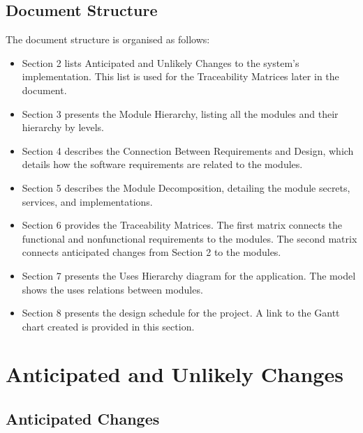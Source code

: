 \documentclass[12pt, titlepage]{article}
\begin{document}
\subsection{Document Structure}
	The document structure is organised as follows:
\begin{itemize}

\item Section 2 lists Anticipated and Unlikely Changes to the system's implementation. This list is used for the Traceability Matrices later in the document.

\item Section 3 presents the Module Hierarchy, listing all the modules and their hierarchy by levels. 

\item Section 4 describes the Connection Between Requirements and Design, which details how the software requirements are related to the modules. 

\item Section 5 describes the Module Decomposition, detailing the module secrets, services, and implementations. 

\item Section 6 provides the Traceability Matrices. The first matrix connects the functional and nonfunctional requirements to the modules. The second matrix connects anticipated changes from Section 2 to the modules.

\item Section 7 presents the Uses Hierarchy diagram for the application. The model shows the uses relations between modules.

\item Section 8 presents the design schedule for the project. A link to the Gantt chart created is provided in this section.

\end{itemize}	


\section{Anticipated and Unlikely Changes} \label{SecChange}
\subsection{Anticipated Changes} \label{SecAchange}
\end{document}
